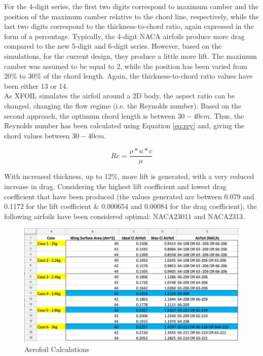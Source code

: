 \documentclass[12pt]{article}
\begin{document}
\noindent For the 4-digit series, the first two digits correspond to maximum camber and the position of the maximum camber relative to the chord line, respectively, while the last two digits correspond to the thickness-to-chord ratio, again expressed in the form of a percentage. Typically, the 4-digit NACA airfoils produce more drag compared to the new 5-digit and 6-digit series. However, based on the simulations, for the current design, they produce a little more lift. The maximum camber was assumed to be equal to 2, while the position has been varied from 20\% to 30\% of the chord length. Again, the thickness-to-chord ratio values have been either 13 or 14. \\

\noindent As XFOIL simulates the airfoil around a 2D body, the aspect ratio can be changed, changing the flow regime (i.e. the Reynolds number). Based on the second approach, the optimum chord length is between $30 - 40cm$. Thus, the Reynolds number has been calculated using Equation \ref{eq:rey} and, giving the chord values between $30 - 40cm$.

\begin{equation}
    Re = \frac{\rho * u * c}{\mu}
    \label{eq:rey}
\end{equation}

\noindent With increased thickness, up to 12\%, more lift is generated, with a very reduced increase in drag. Considering the highest lift coefficient and lowest drag coefficient that have been produced (the values generated are between 0.079 and 0.1172 for the lift coefficient \& 0.000654 and 0.00084 for the drag coefficient), the following airfoils have been considered optimal: NACA23011 and NACA2313. \\

\begin{figure}[h]
    \includegraphics[width=\columnwidth]{aerofoilchoice.png}
    \centering
    \caption{Aerofoil Calculations}
    \label{fig:aerofoilcalc}
\end{figure}
\end{document}
